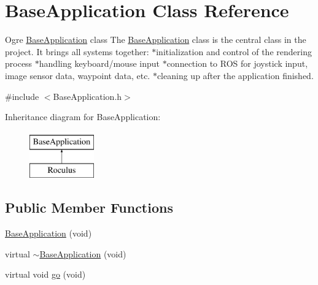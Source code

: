 \hypertarget{classBaseApplication}{\section{\-Base\-Application \-Class \-Reference}
\label{classBaseApplication}
}


\-Ogre \hyperlink{classBaseApplication}{\-Base\-Application} class \-The \hyperlink{classBaseApplication}{\-Base\-Application} class is the central class in the project. \-It brings all systems together\-: $\ast$initialization and control of the rendering process $\ast$handling keyboard/mouse input $\ast$connection to \-R\-O\-S for joystick input, image sensor data, waypoint data, etc. $\ast$cleaning up after the application finished.  




{\ttfamily \#include $<$\-Base\-Application.\-h$>$}

\-Inheritance diagram for \-Base\-Application\-:\begin{figure}[H]
\begin{center}
\leavevmode
\includegraphics[height=2.000000cm]{classBaseApplication}
\end{center}
\end{figure}
\subsection*{\-Public \-Member \-Functions}
\begin{DoxyCompactItemize}
\item 
\hyperlink{classBaseApplication_a7c897f08816cc064568ae1ec71026719}{\-Base\-Application} (void)
\item 
virtual \hyperlink{classBaseApplication_a39133f736b9eb70263cebaca3e6d2cad}{$\sim$\-Base\-Application} (void)
\item 
virtual void \hyperlink{classBaseApplication_aed497661d1817ed9d659fb4de671ac1c}{go} (void)
\end{DoxyCompactItemize}

